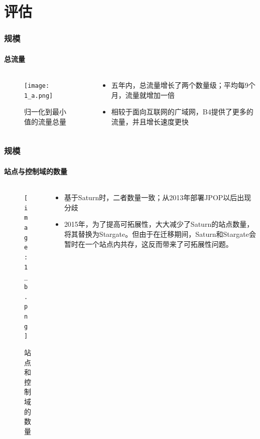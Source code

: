 \section{评估}
\begin{frame}
    \frametitle{规模}
    \framesubtitle{总流量}
    \begin{columns}
        \begin{column}{0.4\textwidth}
            \begin{figure}
                \centering
                \texttt{[image: 1\_a.png]}
                \caption{归一化到最小值的流量总量}
            \end{figure}
        \end{column}

        \begin{column}{0.6\textwidth}
            \begin{itemize}
                \item 五年内，总流量增长了两个数量级；平均每9个月，流量就增加一倍
                \item 相较于面向互联网的广域网，B4提供了更多的流量，并且增长速度更快
            \end{itemize}
        \end{column}
    \end{columns}
\end{frame}

\begin{frame}
    \frametitle{规模}
    \framesubtitle{站点与控制域的数量}
    \begin{columns}
        \begin{column}{0.4\textwidth}
            \begin{figure}
                \centering
                \texttt{[image: 1\_b.png]}
                \caption{站点和控制域的数量}
            \end{figure}
        \end{column}

        \begin{column}{0.6\textwidth}
            \begin{itemize}
                \item 基于Saturn时，二者数量一致；从2013年部署JPOP以后出现分歧
                \item 2015年，为了提高可拓展性，大大减少了Saturn的站点数量，将其替换为Stargate。但由于在迁移期间，Saturn和Stargate会暂时在一个站点内共存，这反而带来了可拓展性问题。
            \end{itemize}
        \end{column}
    \end{columns}
\end{frame}

